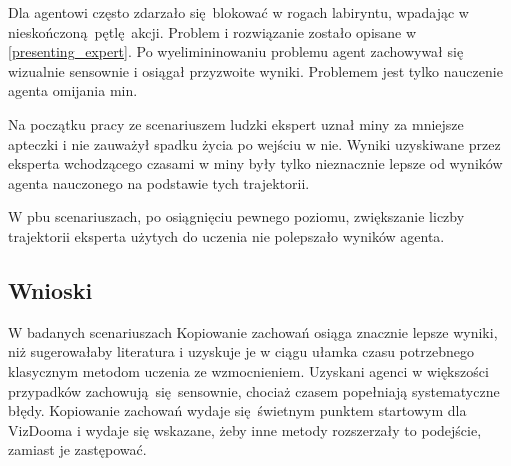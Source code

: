 Dla  agentowi często zdarzało się blokować w rogach labiryntu, wpadając w nieskończoną pętlę akcji. Problem i rozwiązanie zostało opisane w \ref{presenting_expert}. Po wyelimininowaniu problemu agent zachowywał się wizualnie sensownie i osiągał przyzwoite wyniki. Problemem jest tylko nauczenie agenta omijania min.

Na początku pracy ze scenariuszem ludzki ekspert uznał miny za mniejsze apteczki i nie zauważył spadku życia po wejściu w nie. Wyniki uzyskiwane przez eksperta wchodzącego czasami w miny były tylko nieznacznie lepsze od wyników agenta nauczonego na podstawie tych trajektorii.

W pbu scenariuszach, po osiągnięciu pewnego poziomu, zwiększanie liczby trajektorii eksperta użytych do uczenia nie polepszało wyników agenta. 

\subsection{Wnioski}
W badanych scenariuszach Kopiowanie zachowań osiąga znacznie lepsze wyniki, niż sugerowałaby literatura i uzyskuje je w ciągu ułamka czasu potrzebnego klasycznym metodom uczenia ze wzmocnieniem. Uzyskani agenci w większości przypadków zachowują się sensownie, chociaż czasem popełniają systematyczne błędy. Kopiowanie zachowań wydaje się świetnym punktem startowym dla VizDooma i wydaje się wskazane, żeby inne metody rozszerzały to podejście, zamiast je zastępować.
